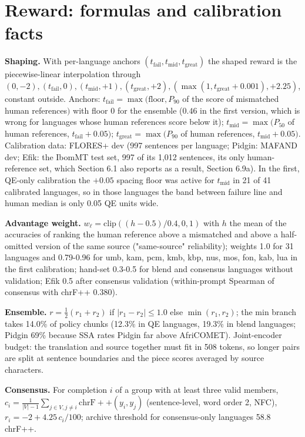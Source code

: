 \section{Reward: formulas and calibration facts}\label{reward-formulas-and-calibration-facts}

\textbf{Shaping.} With per-language anchors \((t_\text{fail}, t_\text{mid}, t_\text{great})\) the shaped reward is the piecewise-linear interpolation through \((0,-2), (t_\text{fail}, 0), (t_\text{mid}, +1), (t_\text{great}, +2), (\max(1, t_\text{great}+0.001), +2.25)\), constant outside. Anchors: \(t_\text{fail}=\max(\text{floor}, P_{90}\) of the score of mismatched human references\()\) with floor 0 for the ensemble (\(0.46\) in the first version, which is wrong for languages whose human references score below it); \(t_\text{mid}=\max(P_{50}\) of human references, \(t_\text{fail}+0.05)\); \(t_\text{great}=\max(P_{90}\) of human references, \(t_\text{mid}+0.05)\). Calibration data: FLORES+ dev (997 sentences per language; Pidgin: MAFAND dev; Efik: the IbomMT test set, 997 of its 1,012 sentences, its only human-reference set, which Section 6.1 also reports as a result, Section 6.9a). In the first, QE-only calibration the \(+0.05\) spacing floor was active for \(t_\text{mid}\) in 21 of 41 calibrated languages, so in those languages the band between failure line and human median is only 0.05 QE units wide.

\textbf{Advantage weight.} \(w_\ell=\mathrm{clip}((h-0.5)/0.4,0,1)\) with \(h\) the mean of the accuracies of ranking the human reference above a mismatched and above a half-omitted version of the same source ("same-source" reliability); weights 1.0 for 31 languages and 0.79-0.96 for umb, kam, pcm, kmb, kbp, nus, mos, fon, kab, lua in the first calibration; hand-set 0.3-0.5 for blend and consensus languages without validation; Efik 0.5 after consensus validation (within-prompt Spearman of consensus with chrF++ 0.380).

\textbf{Ensemble.} \(r=\tfrac12(r_1+r_2)\) if \(|r_1-r_2|\le 1.0\) else \(\min(r_1,r_2)\); the min branch takes 14.0\% of policy chunks (12.3\% in QE languages, 19.3\% in blend languages; Pidgin 69\% because SSA rates Pidgin far above AfriCOMET). Joint-encoder budget: the translation and source together must fit in 508 tokens, so longer pairs are split at sentence boundaries and the piece scores averaged by source characters.

\textbf{Consensus.} For completion \(i\) of a group with at least three valid members, \(c_i=\frac{1}{|V|-1}\sum_{j\in V, j\ne i}\mathrm{chrF{+}{+}}(y_i,y_j)\) (sentence-level, word order 2, NFC), \(r_i=-2+4.25\,c_i/100\); archive threshold for consensus-only languages 58.8 chrF++.

